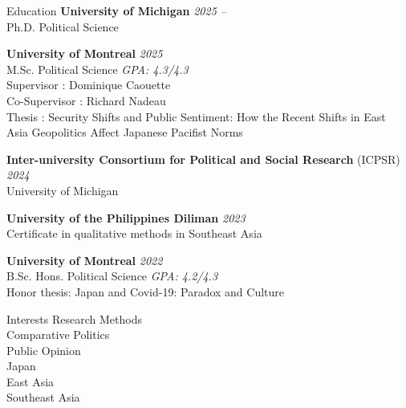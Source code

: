 \documentclass{resume} %
\begin{document}

\begin{rSection}{Education}
{\bf University of Michigan} \hfill {\em 2025 -- }
\\ Ph.D. Political Science

{\bf University of Montreal} \hfill {\em 2025} 
\\ M.Sc. Political Science \hfill {\em GPA: 4.3/4.3}
\\ Supervisor : Dominique Caouette 
\\ Co-Supervisor : Richard Nadeau
\\ Thesis : Security Shifts and Public Sentiment: How the Recent Shifts in East Asia Geopolitics Affect Japanese Pacifist Norms

{\bf Inter-university Consortium for Political and Social Research} (ICPSR) \hfill {\em 2024} 
\\University of Michigan \hfill 

{\bf University of the Philippines Diliman} \hfill {\em 2023} 
\\ Certificate in qualitative methods in Southeast Asia\hfill 

{\bf University of Montreal} \hfill {\em 2022}
\\ B.Sc. Hons. Political Science \hfill {\em GPA: 4.2/4.3}
\\ Honor thesis: Japan and Covid-19: Paradox and Culture

\end{rSection}


\begin{rSection}{Interests}
Research Methods
\\ Comparative Politics
\\ Public Opinion
\\ Japan
\\ East Asia
\\ Southeast Asia
\end{rSection}
\end{document}
